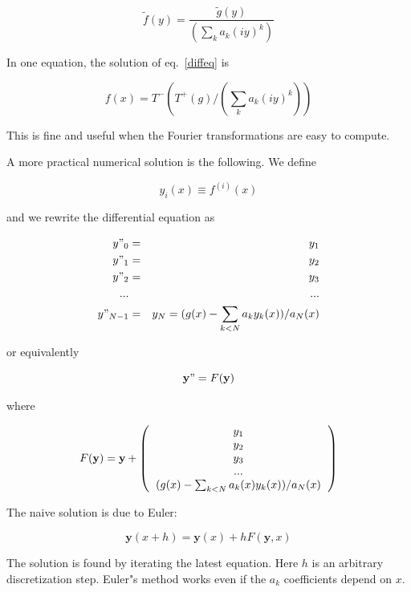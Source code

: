 \documentclass[justified, sixbynine]{tufte-book}
\theoremstyle{plain}%
\newtheorem * {corollary}{Corollary}
\theoremstyle{definition}
\theoremstyle{remark}
\newtheorem * {remark}{Remark}
\newtheorem * {note}{Note}
\begin{document}
\begin{fullwidth}
\begin{equation}
\tilde f(y) = \frac{\tilde g(y)}{(\sum _k a_k (i y)^k)}
\end{equation}

In one equation, the solution of eq.~\ref{diffeq} is

\begin{equation}
f(x) = T^-(T^+(g)/(\sum _k a_k (iy)^k))
\end{equation}

This is fine and useful when the Fourier transformations are easy to compute.

A more practical numerical solution is the following. We define

\begin{equation}
y_i(x) \equiv f^{(i)}(x)
\end{equation}

and we rewrite the differential equation as

\begin{eqnarray}
y"_0 &=& y_1 \\
y"_1 &=& y_2 \\
y"_2 &=& y_3 \\
... && ... \\
y"_{N-1} &=& y_N = (g(x)-\sum_{k<N} a_k y_k(x))/a_N(x)
\end{eqnarray}

or equivalently

\begin{equation}
\mathbf{y}" = F(\mathbf{y})
\end{equation}

where

\begin{equation}
F(\mathbf{y}) = \mathbf{y}+\left(\begin{tabular}{c}
$y_1$ \\
$y_2$ \\
$y_3$ \\
... \\
$(g(x)-\sum_{k<N} a_k(x)y_k(x))/a_N(x)$
\end{tabular}\right)
\end{equation}

The naive solution is due to Euler:

\begin{equation}
\mathbf{y}(x+h) = \mathbf{y}(x) + hF(\mathbf{y}, x)\label{euler}
\end{equation}

The solution is found by iterating the latest equation. Here $h$ is an arbitrary discretization step. Euler"s method works even if the $a_k$ coefficients depend on $x$.


\end{fullwidth}
\end{document}
